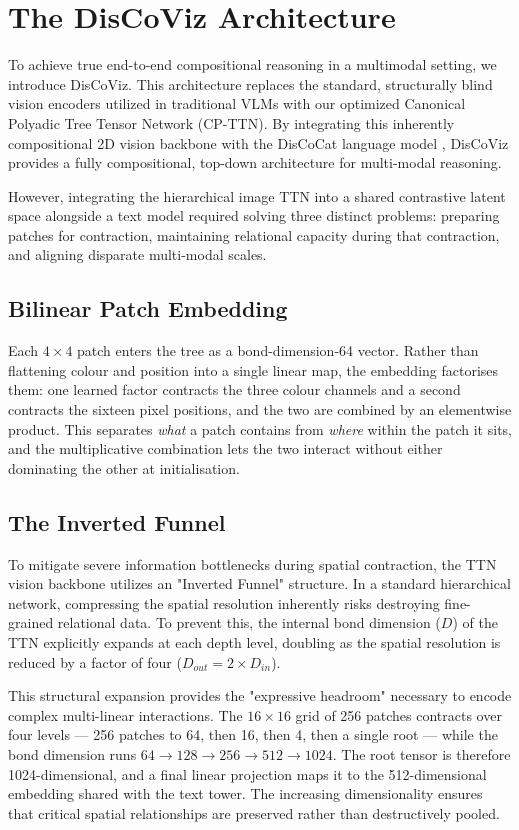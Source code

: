 \documentclass[12pt, a4paper, oneside]{report}
\begin{document}
\section{The DisCoViz Architecture}

To achieve true end-to-end compositional reasoning in a multimodal setting, we introduce DisCoViz. This architecture replaces the standard, structurally blind vision encoders utilized in traditional VLMs with our optimized Canonical Polyadic Tree Tensor Network (CP-TTN). By integrating this inherently compositional 2D vision backbone with the DisCoCat language model \cite{discocat}, DisCoViz provides a fully compositional, top-down architecture for multi-modal reasoning. 

However, integrating the hierarchical image TTN into a shared contrastive latent space alongside a text model required solving three distinct problems: preparing patches for contraction, maintaining relational capacity during that contraction, and aligning disparate multi-modal scales.

\subsection{Bilinear Patch Embedding}
Each $4 \times 4$ patch enters the tree as a bond-dimension-64 vector. Rather than flattening colour and position into a single linear map, the embedding factorises them: one learned factor contracts the three colour channels and a second contracts the sixteen pixel positions, and the two are combined by an elementwise product. This separates \textit{what} a patch contains from \textit{where} within the patch it sits, and the multiplicative combination lets the two interact without either dominating the other at initialisation.

\subsection{The Inverted Funnel}
To mitigate severe information bottlenecks during spatial contraction, the TTN vision backbone utilizes an "Inverted Funnel" structure. In a standard hierarchical network, compressing the spatial resolution inherently risks destroying fine-grained relational data. To prevent this, the internal bond dimension ($D$) of the TTN explicitly expands at each depth level, doubling as the spatial resolution is reduced by a factor of four ($D_{out} = 2 \times D_{in}$).

This structural expansion provides the "expressive headroom" necessary to encode complex multi-linear interactions. The $16 \times 16$ grid of 256 patches contracts over four levels --- 256 patches to 64, then 16, then 4, then a single root --- while the bond dimension runs $64 \to 128 \to 256 \to 512 \to 1024$. The root tensor is therefore 1024-dimensional, and a final linear projection maps it to the 512-dimensional embedding shared with the text tower. The increasing dimensionality ensures that critical spatial relationships are preserved rather than destructively pooled.
\end{document}
